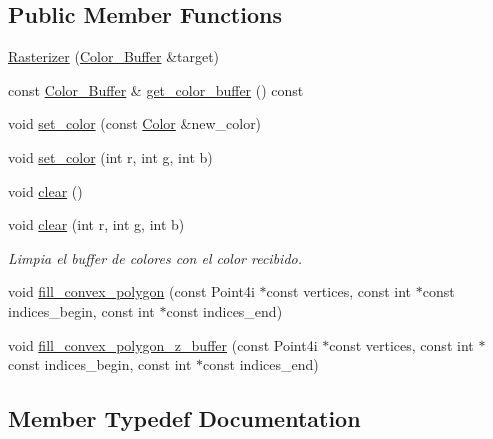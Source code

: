 \subsection*{Public Member Functions}
\begin{DoxyCompactItemize}
\item 
\mbox{\hyperlink{classexample_1_1_rasterizer_abd4a31e3b3bc495d66c0d05df25885a1}{Rasterizer}} (\mbox{\hyperlink{classexample_1_1_rasterizer_a710beccb975a5f1aa771c44f784da525}{Color\+\_\+\+Buffer}} \&target)
\item 
const \mbox{\hyperlink{classexample_1_1_rasterizer_a710beccb975a5f1aa771c44f784da525}{Color\+\_\+\+Buffer}} \& \mbox{\hyperlink{classexample_1_1_rasterizer_a21b94302fba144872555e84af362f87c}{get\+\_\+color\+\_\+buffer}} () const
\item 
void \mbox{\hyperlink{classexample_1_1_rasterizer_a6770b1e636262a2977ee2ccca726b134}{set\+\_\+color}} (const \mbox{\hyperlink{classexample_1_1_rasterizer_aabfa22a5aef17d16a0cfb362fa30e69b}{Color}} \&new\+\_\+color)
\item 
void \mbox{\hyperlink{classexample_1_1_rasterizer_a0043c4af15566e7f0463a22c04c67812}{set\+\_\+color}} (int r, int g, int b)
\item 
void \mbox{\hyperlink{classexample_1_1_rasterizer_a98cb1b7667d18c7038c964e5551d6d56}{clear}} ()
\item 
void \mbox{\hyperlink{classexample_1_1_rasterizer_afaa4b27e01bc41a8a3fcda71d1799052}{clear}} (int r, int g, int b)
\begin{DoxyCompactList}\small\item\em Limpia el buffer de colores con el color recibido. \end{DoxyCompactList}\item 
void \mbox{\hyperlink{classexample_1_1_rasterizer_ae8d8136137381542b9e1ac4ddc410aaa}{fill\+\_\+convex\+\_\+polygon}} (const Point4i $\ast$const vertices, const int $\ast$const indices\+\_\+begin, const int $\ast$const indices\+\_\+end)
\item 
void \mbox{\hyperlink{classexample_1_1_rasterizer_a54faf27d2f9ac25948051944bd5b5d0d}{fill\+\_\+convex\+\_\+polygon\+\_\+z\+\_\+buffer}} (const Point4i $\ast$const vertices, const int $\ast$const indices\+\_\+begin, const int $\ast$const indices\+\_\+end)
\end{DoxyCompactItemize}


\subsection{Member Typedef Documentation}
\mbox{\label{classexample_1_1_rasterizer_aabfa22a5aef17d16a0cfb362fa30e69b}} 
